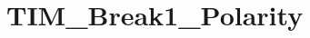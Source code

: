 \hypertarget{group___t_i_m___break1___polarity}{\section{T\-I\-M\-\_\-\-Break1\-\_\-\-Polarity}
\label{group___t_i_m___break1___polarity}
}

